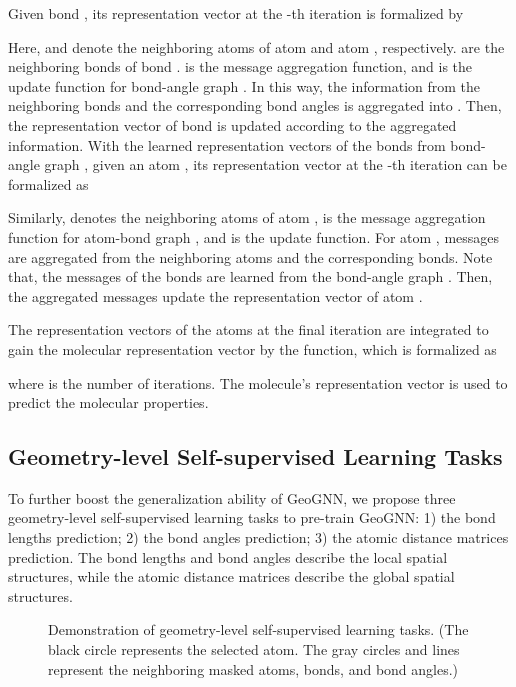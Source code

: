 \documentclass{article}
\begin{document}
Given bond , its representation vector  at the -th iteration is formalized by

Here,  and  denote the neighboring atoms of atom  and atom , respectively.  are the neighboring bonds of bond .  is the message aggregation function, and  is the update function for bond-angle graph . In this way, the information from the neighboring bonds and the corresponding bond angles is aggregated into . Then, the representation vector of bond  is updated according to the aggregated information. With the learned representation vectors of the bonds from bond-angle graph , given an atom , its representation vector  at the -th iteration can be formalized as

Similarly,  denotes the neighboring atoms of atom ,  is the message aggregation function for atom-bond graph , and  is the update function. For atom , messages are aggregated from the neighboring atoms and the corresponding bonds. Note that, the messages of the bonds are learned from the bond-angle graph . Then, the aggregated messages update the representation vector of atom .

The representation vectors of the atoms at the final iteration are integrated to gain the molecular representation vector  by the  function, which is formalized as

where  is the number of iterations. The molecule's representation vector  is used to predict the molecular properties.

\subsection{Geometry-level Self-supervised Learning Tasks}
To further boost the generalization ability of GeoGNN, we propose three geometry-level self-supervised learning tasks to pre-train GeoGNN: 1) the bond lengths prediction; 2) the bond angles prediction; 3) the atomic distance matrices prediction. The bond lengths and bond angles describe the local spatial structures, while the atomic distance matrices describe the global spatial structures.

\begin{figure}[t]
\centering
{}
\label{fig:pretrain}
\caption{Demonstration of geometry-level self-supervised learning tasks. (The black circle represents the selected atom. The gray circles and lines represent the neighboring masked atoms, bonds, and bond angles.)}
\vspace{-0.5em}
\end{figure}
\end{document}

